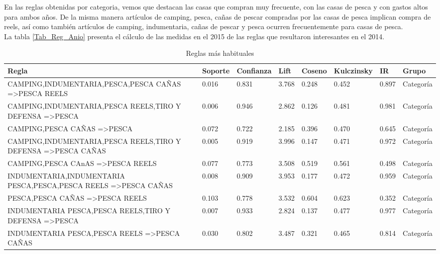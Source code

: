 \documentclass[]{article}
\begin{document}
	En las reglas obtenidas por categoria, vemos que destacan las casas que compran muy frecuente, con las casas de pesca y con gastos altos para ambos años. De la misma manera artículos de camping, pesca, cañas de pescar compradas por las casas de pesca implican compra de reels, así como también artículos de camping, indumentaria, cañas de pescar y pesca ocurren frecuentemente para casas de pesca.\\
	
	La tabla \ref{Tab_Reg_Anio} presenta el cálculo de las medidas en el 2015 de las reglas que resultaron interesantes en el 2014.
	
	\begin{landscape}
		\begin{table}[htbp]
			\centering
			\caption{Reglas más habituales}
			\renewcommand{\arraystretch}{1.2}
			\addtolength{\tabcolsep}{-1.5pt}
			\begin{tabular}{llllllll}
				\textbf{Regla} & \textbf{Soporte} & \textbf{Confianza} & \textbf{Lift} & \textbf{Coseno} & \textbf{Kulczinsky} & \textbf{IR} & \textbf{Grupo} \\
				\hline 		
				{CAMPING,INDUMENTARIA,PESCA,PESCA CAÑAS} =\textgreater {PESCA REELS} & 0.016 & 0.831 & 3.768 & 0.248 & 0.452 & 0.897 & Categoría \\
				{CAMPING,INDUMENTARIA,PESCA REELS,TIRO Y DEFENSA} =\textgreater {PESCA} & 0.006 & 0.946 & 2.862 & 0.126 & 0.481 & 0.981 & Categoría \\
				{CAMPING,PESCA CAÑAS} =\textgreater {PESCA} & 0.072 & 0.722 & 2.185 & 0.396 & 0.470 & 0.645 & Categoría \\
				{CAMPING,INDUMENTARIA,PESCA REELS,TIRO Y DEFENSA} =\textgreater {PESCA CAÑAS} & 0.005 & 0.919 & 3.996 & 0.147 & 0.471 & 0.972 & Categoría \\
				{CAMPING,PESCA CAnAS} =\textgreater {PESCA REELS} & 0.077 & 0.773 & 3.508 & 0.519 & 0.561 & 0.498 & Categoría \\
				{INDUMENTARIA,INDUMENTARIA PESCA,PESCA,PESCA REELS} =\textgreater {PESCA CAÑAS} & 0.008 & 0.909 & 3.953 & 0.177 & 0.472 & 0.959 & Categoría \\
				{PESCA,PESCA CAÑAS} =\textgreater {PESCA REELS} & 0.103 & 0.778 & 3.532 & 0.604 & 0.623 & 0.352 & Categoría \\
				{INDUMENTARIA PESCA,PESCA REELS,TIRO Y DEFENSA} =\textgreater {PESCA} & 0.007 & 0.933 & 2.824 & 0.137 & 0.477 & 0.977 & Categoría \\
				{INDUMENTARIA PESCA,PESCA REELS} =\textgreater {PESCA CAÑAS} & 0.030 & 0.802 & 3.487 & 0.321 & 0.465 & 0.814 & Categoría \\

\end{tabular}
\end{table}
\end{landscape}
\end{document}
